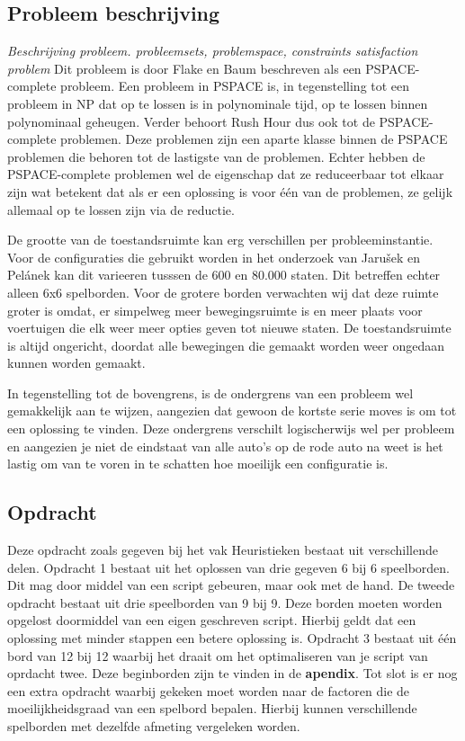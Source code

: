\documentclass[a4paper]{article}
\begin{document}
\subsection{Probleem beschrijving}
\textit{Beschrijving probleem. probleemsets, problemspace, constraints satisfaction problem}
Dit probleem is door Flake en Baum \cite{flake2002rush} beschreven als een PSPACE-complete probleem. Een probleem in PSPACE is, in tegenstelling tot een probleem in NP dat op te lossen is in polynominale tijd, op te lossen binnen polynominaal geheugen. Verder behoort Rush Hour dus ook tot de PSPACE-complete problemen. Deze problemen zijn een aparte klasse binnen de PSPACE problemen die behoren tot de lastigste van de problemen. Echter hebben de PSPACE-complete problemen wel de eigenschap dat ze reduceerbaar tot elkaar zijn wat betekent dat als er een oplossing is voor één van de problemen, ze gelijk allemaal op te lossen zijn via de reductie.

De grootte van de toestandsruimte kan erg verschillen per probleeminstantie. Voor de configuraties die gebruikt worden in het onderzoek van Jarušek en Pelánek \cite{jaruvsek2011determines} kan dit varieeren tusssen de 600 en 80.000 staten. Dit betreffen echter alleen 6x6 spelborden. Voor de grotere borden verwachten wij dat deze ruimte groter is omdat, er simpelweg meer bewegingsruimte is en meer plaats voor voertuigen die elk weer meer opties geven tot nieuwe staten. De toestandsruimte is altijd ongericht, doordat alle bewegingen die gemaakt worden weer ongedaan kunnen worden gemaakt.

In tegenstelling tot de bovengrens, is de ondergrens van een probleem wel gemakkelijk aan te wijzen, aangezien dat gewoon de kortste serie moves is om tot een oplossing te vinden. Deze ondergrens verschilt logischerwijs wel per probleem en aangezien je niet de eindstaat van alle auto's op de rode auto na weet is het lastig om van te voren in te schatten hoe moeilijk een configuratie is.

\subsection{Opdracht}
Deze opdracht zoals gegeven bij het vak Heuristieken bestaat uit verschillende delen. Opdracht 1 bestaat uit het oplossen van drie gegeven 6 bij 6 speelborden. Dit mag door middel van een script gebeuren, maar ook met de hand. De tweede opdracht bestaat uit drie speelborden van 9 bij 9. Deze borden moeten worden opgelost doormiddel van een eigen geschreven script. Hierbij geldt dat een oplossing met minder stappen een betere oplossing is. Opdracht 3 bestaat uit één bord van 12 bij 12 waarbij het draait om het optimaliseren van je script van oprdacht twee. Deze beginborden zijn te vinden in de \textbf{apendix}. Tot slot is er nog een extra opdracht waarbij gekeken moet worden naar de factoren die de moeilijkheidsgraad van een spelbord bepalen. Hierbij kunnen verschillende spelborden met dezelfde afmeting vergeleken worden.
\end{document}
